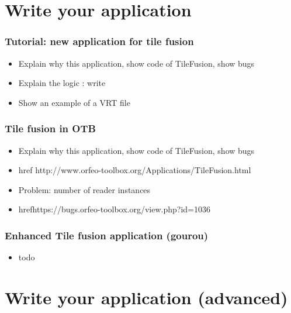 \documentclass[8pt]{beamer}
\begin{document}
\section{Write your  application}
\begin{frame}
\frametitle{Tutorial: new application for tile fusion}
\begin{itemize}
\item Explain why this application, show code of TileFusion, show bugs 
\item Explain the logic : write 
\item Show an example of a VRT file
\end{itemize}
\end{frame}

\begin{frame}
\frametitle{Tile fusion in OTB}
\begin{itemize}
\item Explain why this application, show code of TileFusion, show bugs
\item href{ http://www.orfeo-toolbox.org/Applications/TileFusion.html}
\item Problem: number of reader instances
\item href{https://bugs.orfeo-toolbox.org/view.php?id=1036}
\end{itemize}
\end{frame}

\begin{frame}
\frametitle{Enhanced Tile fusion application (gourou)}
\begin{itemize}
\item todo
\end{itemize}
\end{frame}

\section{Write your application (advanced)}





\end{document}
